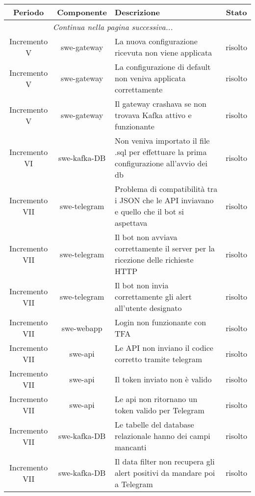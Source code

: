 	\begin{center}
		\begin{longtable}{|c|c|p{9.5cm}|c|}
		\hline
		\rowcolor{lighter-grayer}
		\textbf{Periodo} & \textbf{Componente} & \textbf{Descrizione} & \textbf{Stato} \\
		\hline
		\endhead
		\hline
        \multicolumn{3}{|c|}{\textit{Continua nella pagina successiva...}}\\
        \hline
        \endfoot
        \endlastfoot

		\hline


    Incremento V & swe-gateway & La nuova configurazione ricevuta non viene applicata & risolto \\
    \hline
    Incremento V & swe-gateway & La configurazione di default non veniva applicata correttamente & risolto \\
    \hline
    Incremento V & swe-gateway & Il gateway crashava se non trovava Kafka attivo e funzionante & risolto \\
    \hline
    Incremento VI & swe-kafka-DB & Non veniva importato il file .sql per effettuare la prima configurazione all'avvio dei db & risolto \\
    \hline
    Incremento VII & swe-telegram & Problema di compatibilità tra i JSON che le API inviavano e quello che il bot si aspettava & risolto \\
    \hline
    Incremento VII & swe-telegram & Il bot non avviava correttamente il server per la ricezione delle richieste HTTP & risolto \\
    \hline
    Incremento VII & swe-telegram & Il bot non invia correttamente gli alert all'utente designato & risolto \\
    \hline
    Incremento VII & swe-webapp & Login non funzionante con TFA & risolto \\
    \hline
    Incremento VII & swe-api & Le API non inviano il codice corretto tramite telegram & risolto \\
    \hline
    Incremento VII & swe-api & Il token inviato non è valido & risolto \\
    \hline
    Incremento VII & swe-api & Le api non ritornano un token valido per Telegram & risolto \\
    \hline
    Incremento VII & swe-kafka-DB & Le tabelle del database relazionale hanno dei campi mancanti & risolto \\
    \hline
    Incremento VII & swe-kafka-DB & Il data filter non recupera gli alert positivi da mandare poi a Telegram & risolto \\

\end{longtable}
\end{center}
